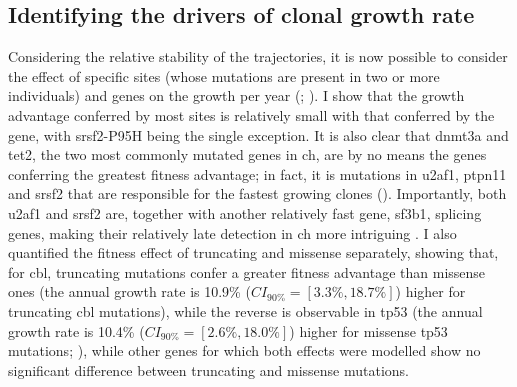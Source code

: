 \begin{figure}[!ht]
	\label{fig:ch-bad-trajectories-examples}
\end{figure}

\subsection{Identifying the drivers of clonal growth rate}

Considering the relative stability of the trajectories, it is now possible to consider the effect of specific sites (whose mutations are present in two or more individuals) and genes on the growth per year (; ). I show that the growth advantage conferred by most sites is relatively small with that conferred by the gene, with \ac{srsf2}-P95H being the single exception. It is also clear that \ac{dnmt3a} and \ac{tet2}, the two most commonly mutated genes in \ac{ch}, are by no means the genes conferring the greatest fitness advantage; in fact, it is mutations in \ac{u2af1}, \ac{ptpn11} and \ac{srsf2} that are responsible for the fastest growing clones (). Importantly, both \ac{u2af1} and \ac{srsf2} are, together with another relatively fast gene, \ac{sf3b1}, splicing genes, making their relatively late detection in \ac{ch} more intriguing \cite{McKerrell2015}. I also quantified the fitness effect of truncating and missense separately, showing that, for \ac{cbl}, truncating mutations confer a greater fitness advantage than missense ones (the annual growth rate is 10.9\% ($CI_{90\%}=[3.3\%,18.7\%]$) higher for truncating \ac{cbl} mutations), while the reverse is observable in \ac{tp53} (the annual growth rate is 10.4\% ($CI_{90\%}=[2.6\%,18.0\%]$) higher for missense \ac{tp53} mutations; ), while other genes for which both effects were modelled show no significant difference between truncating and missense mutations.

\begin{figure}[!ht]
	\label{fig:ch-gene-site-coefficients}
\end{figure}

